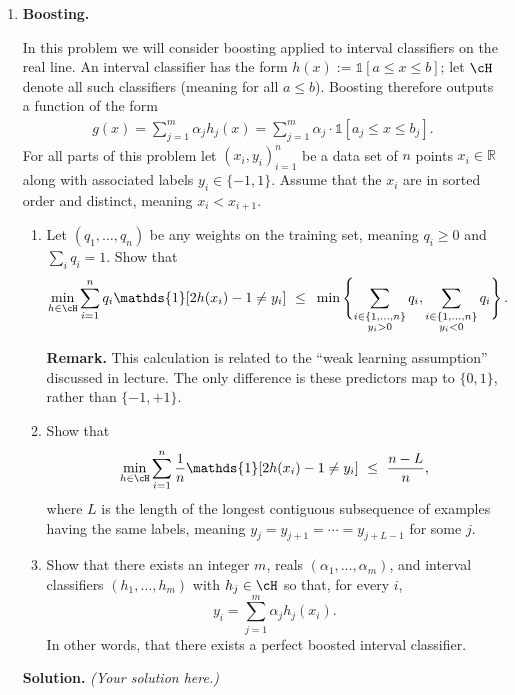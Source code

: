 \documentclass{article}
\def\1{\mathds{1}}
\theoremstyle{definition}
\theoremstyle{remark}
\newenvironment{Q}
                {%
                    \clearpage
                \item
                    }
                {%
                    \phantom{s}
                  \bigskip
                  \textbf{Solution.}
                }
\begin{document}
\begin{enumerate}
      \begin{Q}
          \textbf{Boosting.}
          
          In this problem we will consider boosting applied to interval classifiers on the real line.
          An interval classifier has the form $h(x) := \1[ a \leq x \leq b]$; let $\cH$
          denote all such classifiers (meaning for all $a\leq b$).
          Boosting therefore outputs a function of the form
          \begin{align*}
          g(x) = \sum_{j=1}^m \alpha_j h_j(x) = \sum_{j=1}^m  \alpha_j \cdot\1[ a_j \leq x \leq b_j].
          \end{align*}  
          For all parts of this problem let $ (x_i,y_i)_{i=1}^n$ be a data set of $n$ points $x_i \in \mathbb{R}$ along with associated labels $y_i \in \{-1,1\}$.  Assume that the $x_i$ are in sorted order and distinct, meaning $x_i < x_{i+1}$. 
          \begin{enumerate}
            \item
              Let $(q_1,\ldots,q_n)$ be any weights on the training set, meaning
              $q_i \geq 0$ and $\sum_i q_i = 1$.  Show that
              \[
                \min_{h\in \cH} \sum_{i=1}^n q_i \1[ 2h(x_i)-1 \neq y_i ]
                \ \leq\ {}
                \min\cbr[4]{ \sum_{\substack{i\in \{1,\ldots,n\}\\y_i > 0}} q_i,
                \sum_{\substack{i\in \{1,\ldots,n\}\\y_i < 0}} q_i }.
              \]

              \textbf{Remark.}  This calculation is related to the ``weak learning assumption''
              discussed in lecture.  The only difference is these predictors map to $\{0,1\}$,
              rather than $\{-1,+1\}$.

            \item
              Show that
              \[
                \min_{h\in \cH} \sum_{i=1}^n \frac 1 n \1[ 2h(x_i)-1 \neq y_i ]
                \ \leq\ {}
                \frac{n-L}{n},
              \]
              where $L$ is the length of the longest contiguous subsequence of examples having
              the same labels, meaning $y_j = y_{j+1} = \cdots = y_{j+L-1}$ for some $j$.

            \item
              Show that there exists an integer $m$, reals $(\alpha_1,\ldots,\alpha_m)$,
              and interval classifiers $(h_1,\ldots,h_m)$ with $h_j \in \cH$
              so that, for every $i$,
              \[
                y_i = \sum_{j=1}^m \alpha_j h_j(x_i).
              \]
              In other words, that there exists a perfect boosted interval classifier.
      \end{enumerate}
    \end{Q}
                        \emph{(Your solution here.)}



\end{enumerate}
\end{document}
